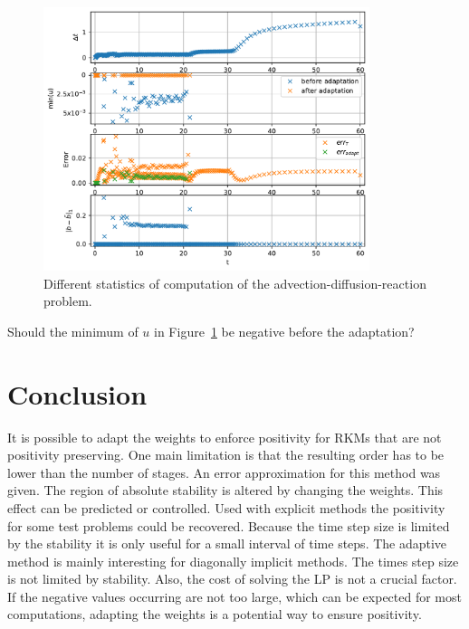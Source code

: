 \documentclass[a4paper]{article}
\numberwithin{equation}{section}
\theoremstyle{plain}
\theoremstyle{definition}
\numberwithin{theorem}{section}
\newcommand{\1}{\mathbbm{1}}
\newcommand{\todo}[1]{{\Large{\color{red}{#1}}}}
\begin{document}
\begin{figure}
\centering
\includegraphics[width=0.85\textwidth]{plots/ADP_stepsize,b.pdf}
\caption{Different statistics of computation of the advection-diffusion-reaction problem.}
\label{fig:Stats_ADP}
\end{figure}

\todo{Note (HR)} Should the minimum of $u$ in Figure~\ref{fig:Stats_ADP} be negative before the adaptation? %


\section{Conclusion} \label{sec:conclusion}
It is possible to adapt the weights to enforce positivity for RKMs that are not positivity preserving. 
One main limitation is that the resulting order has to be lower than the number of stages.
An error approximation for this method was given.  
The region of absolute stability is altered by changing the weights. This effect can be predicted or controlled. 
Used with explicit methods the positivity for some test problems could be recovered.  
Because the time step size is limited by the stability it is only useful for a small interval of time steps. 
The adaptive method is mainly interesting for diagonally implicit methods.
The times step size is not limited by stability. 
Also, the cost of solving the LP is not a crucial factor.  
If the negative values occurring are not too large, which can be expected for most computations, adapting the weights is a potential way to ensure positivity. 




\printbibliography
\end{document}
